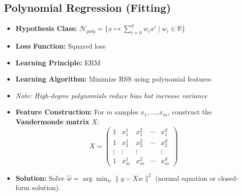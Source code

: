 \subsection{Polynomial Regression (Fitting)}
\begin{itemize}
    \item \textbf{Hypothesis Class:} $\mathcal{H}_\mathit{poly} = \{x \mapsto \sum_{i=0}^d w_i x^i \mid w_i \in \mathbb{R}\}$
    \item \textbf{Loss Function:} Squared loss
    \item \textbf{Learning Principle:} ERM
    \item \textbf{Learning Algorithm:} Minimize RSS using polynomial features
    \item[] \textit{Note: High-degree polynomials reduce bias but increase variance}
    \item \textbf{Feature Construction:} For $m$ samples $x_1,\ldots,x_m$, construct the \textbf{Vandermonde matrix} $X$:
          \[
              X = \begin{pmatrix}
                  1      & x_1^1  & x_1^2  & \cdots & x_1^d  \\
                  1      & x_2^1  & x_2^2  & \cdots & x_2^d  \\
                  \vdots & \vdots & \vdots &        & \vdots \\
                  1      & x_m^1  & x_m^2  & \cdots & x_m^d
              \end{pmatrix}
          \]
    \item \textbf{Solution:} Solve $\hat{w} = \arg\min_w \|y - Xw\|^2$ (normal equation or closed-form solution).
\end{itemize}
